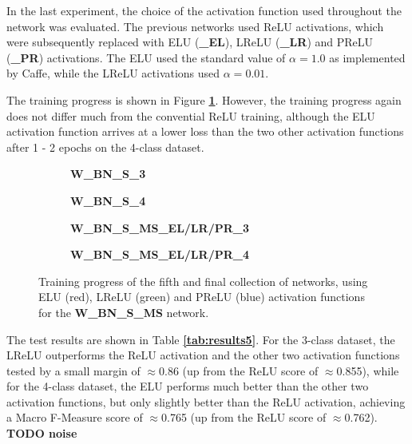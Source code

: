 In the last experiment, the choice of the activation function used throughout the network was evaluated. The previous networks used ReLU activations, which were subsequently replaced with ELU (\textbf{\_EL}), LReLU (\textbf{\_LR}) and PReLU (\textbf{\_PR}) activations. The ELU used the standard value of $\alpha = 1.0$ as implemented by Caffe, while the LReLU activations used $\alpha = 0.01$.

The training progress is shown in Figure \textbf{\ref{fig:weighted_batchnorm_shuffle_msra_acts_training}}. However, the training progress again does not differ much from the convential ReLU training, although the ELU activation function arrives at a lower loss than the two other activation functions after 1 - 2 epochs on the 4-class dataset.\\

\begin {figure}[!htb]
	\begin {subfigure}[b]{0.4\linewidth}
		\scalebox{0.65}{}
		\caption{\textbf{W\_BN\_S\_3}}
	\end {subfigure}\hspace{1.75cm}
	\begin {subfigure}[b]{0.4\linewidth}
		\scalebox{0.65}{}
		\caption{\textbf{W\_BN\_S\_4}}
	\end {subfigure}

	\begin {subfigure}[b]{0.4\linewidth}
		\scalebox{0.65}{}
		\caption{\textbf{W\_BN\_S\_MS\_EL/LR/PR\_3}}
	\end {subfigure}\hspace{1.75cm}
	\begin {subfigure}[b]{0.4\linewidth}
		\scalebox{0.65}{}
		\caption{\textbf{W\_BN\_S\_MS\_EL/LR/PR\_4}}
	\end {subfigure}

		\caption[Training progress of the fifth collection of networks.]{Training progress of the fifth and final collection of networks, using ELU (red), LReLU (green) and PReLU (blue) activation functions for the \textbf{W\_BN\_S\_MS} network.}
		\label{fig:weighted_batchnorm_shuffle_msra_acts_training}
\end {figure}

The test results are shown in Table \textbf{\ref{tab:results5}}. For the 3-class dataset, the LReLU outperforms the ReLU activation and the other two activation functions tested by a small margin of $\approx$0.86 (up from the ReLU score of $\approx$0.855), while for the 4-class dataset, the ELU performs much better than the other two activation functions, but only slightly better than the ReLU activation, achieving a Macro F-Measure score of $\approx$0.765 (up from the ReLU score of $\approx$0.762). \textbf{TODO noise}\\

